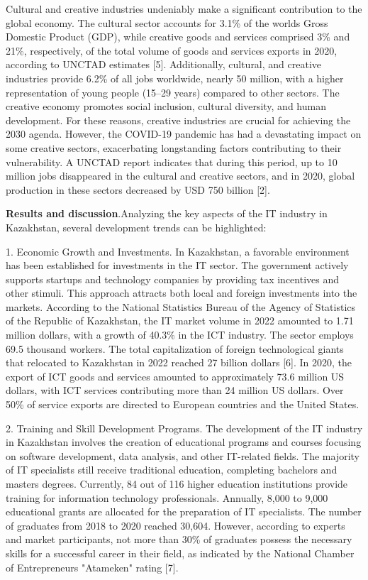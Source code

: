\begin{multicols}{2}
Cultural and creative industries undeniably make a significant
contribution to the global economy. The cultural sector accounts for
3.1\% of the world\textquotesingle s Gross Domestic Product (GDP), while
creative goods and services comprised 3\% and 21\%, respectively, of the
total volume of goods and services exports in 2020, according to UNCTAD
estimates {[}5{]}. Additionally, cultural, and creative industries
provide 6.2\% of all jobs worldwide, nearly 50 million, with a higher
representation of young people (15--29 years) compared to other sectors.
The creative economy promotes social inclusion, cultural diversity, and
human development. For these reasons, creative industries are crucial
for achieving the 2030 agenda. However, the COVID-19 pandemic has had a
devastating impact on some creative sectors, exacerbating longstanding
factors contributing to their vulnerability. A UNCTAD report indicates
that during this period, up to 10 million jobs disappeared in the
cultural and creative sectors, and in 2020, global production in these
sectors decreased by USD 750 billion {[}2{]}.

{\bfseries Results and discussion}.Analyzing the key aspects of the IT
industry in Kazakhstan, several development trends can be highlighted:

1. Economic Growth and Investments. In Kazakhstan, a favorable
environment has been established for investments in the IT sector. The
government actively supports startups and technology companies by
providing tax incentives and other stimuli. This approach attracts both
local and foreign investments into the markets. According to the
National Statistics Bureau of the Agency of Statistics of the Republic
of Kazakhstan, the IT market volume in 2022 amounted to 1.71 million
dollars, with a growth of 40.3\% in the ICT industry. The sector employs
69.5 thousand workers. The total capitalization of foreign technological
giants that relocated to Kazakhstan in 2022 reached 27 billion dollars
{[}6{]}. In 2020, the export of ICT goods and services amounted to
approximately 73.6 million US dollars, with ICT services contributing
more than 24 million US dollars. Over 50\% of service exports are
directed to European countries and the United States.

2. Training and Skill Development Programs. The development of the IT
industry in Kazakhstan involves the creation of educational programs and
courses focusing on software development, data analysis, and other
IT-related fields. The majority of IT specialists still receive
traditional education, completing bachelor\textquotesingle s and
master\textquotesingle s degrees. Currently, 84 out of 116 higher
education institutions provide training for information technology
professionals. Annually, 8,000 to 9,000 educational grants are allocated
for the preparation of IT specialists. The number of graduates from 2018
to 2020 reached 30,604. However, according to experts and market
participants, not more than 30\% of graduates possess the necessary
skills for a successful career in their field, as indicated by the
National Chamber of Entrepreneurs "Atameken" rating {[}7{]}.


\end{multicols}

